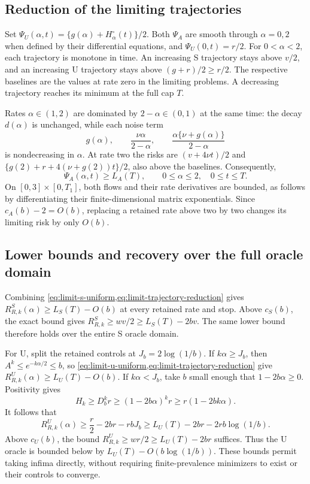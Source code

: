 \subsection{Reduction of the limiting trajectories}

Set $\Psi_U(\alpha,t)=\{g(\alpha)+H^\circ_\alpha(t)\}/2$. Both $\Psi_A$
are smooth through $\alpha=0,2$ when defined by their differential equations,
and $\Psi_U(0,t)=r/2$. For $0<\alpha<2$, each trajectory is monotone in
time. An increasing S trajectory stays above $v/2$, and an increasing U
trajectory stays above $(g+r)/2\geq r/2$. The respective baselines are the
values at rate zero in the limiting problems. A decreasing trajectory reaches
its minimum at the full cap $T$.

Rates $\alpha\in(1,2)$ are dominated by $2-\alpha\in(0,1)$ at the same time:
the decay $d(\alpha)$ is unchanged, while each noise term
\[
  g(\alpha),\qquad \frac{\nu\alpha}{2-\alpha},\qquad
  \frac{\alpha\{\nu+g(\alpha)\}}{2-\alpha}
\]
is nondecreasing in $\alpha$. At rate two the risks are
$(v+4\nu t)/2$ and $\{g(2)+r+4(\nu+g(2))t\}/2$, also above the baselines.
Consequently,
\begin{equation}
  \Psi_A(\alpha,t)\geq L_A(T),
  \qquad 0\leq\alpha\leq2,\quad 0\leq t\leq T.
  \label{eq:limit-trajectory-reduction}
\end{equation}
On $[0,3]\times[0,T_1]$, both flows and their rate derivatives are bounded,
as follows by differentiating their finite-dimensional matrix exponentials.
Since $c_A(b)-2=O(b)$, replacing a retained rate above two by two changes its
limiting risk by only $O(b)$.

\subsection{Lower bounds and recovery over the full oracle domain}

Combining \cref{eq:limit-s-uniform,eq:limit-trajectory-reduction} gives
$R^S_{R,k}(\alpha)\geq L_S(T)-O(b)$ at every retained rate and stop. Above
$c_S(b)$, the exact bound gives
$R^S_{R,k}\geq wv/2\geq L_S(T)-2bv$. The same lower bound therefore holds
over the entire S oracle domain.

For U, split the retained controls at $J_b=2\log(1/b)$. If
$k\alpha\geq J_b$, then $A^k\leq e^{-k\alpha/2}\leq b$, so
\cref{eq:limit-u-uniform,eq:limit-trajectory-reduction} give
$R^U_{R,k}(\alpha)\geq L_U(T)-O(b)$. If $k\alpha<J_b$, take $b$ small
enough that $1-2b\alpha\geq0$. Positivity gives
\[
  H_k\geq D_b^kr\geq(1-2b\alpha)^kr\geq r(1-2bk\alpha).
\]
It follows that
\[
  R^U_{R,k}(\alpha)\geq\frac r2-2br-rbJ_b
    \geq L_U(T)-2br-2rb\log(1/b).
\]
Above $c_U(b)$, the bound $R^U_{R,k}\geq wr/2\geq L_U(T)-2br$ suffices.
Thus the U oracle is bounded below by $L_U(T)-O(b\log(1/b))$. These bounds
permit taking infima directly, without requiring finite-prevalence minimizers
to exist or their controls to converge.

